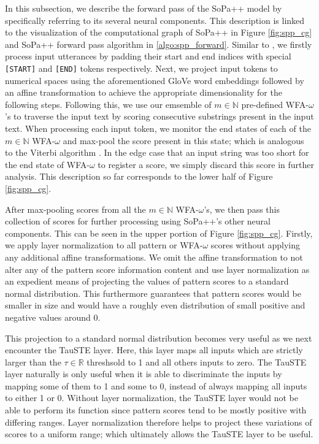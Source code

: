 In this subsection, we describe the forward pass of the SoPa++ model by
specifically referring to its several neural components. This description is
linked to the visualization of the computational graph of SoPa++ in Figure
\ref{fig:spp_cg} and SoPa++ forward pass algorithm in \ref{algo:spp_forward}.
Similar to \citet{schwartz2018sopa}, we firstly process input utterances by
padding their start and end indices with special \texttt{[START]} and
\texttt{[END]} tokens respectively. Next, we project input tokens to numerical
spaces using the aforementioned GloVe word embeddings followed by an affine
transformation to achieve the appropriate dimensionality for the following
steps. Following this, we use our emsemble of $m \in \mathbb{N}$ pre-defined
WFA-$\omega$'s to traverse the input text by scoring consecutive substrings
present in the input text. When processing each input token, we monitor the end
states of each of the $m \in \mathbb{N}$ WFA-$\omega$ and max-pool the score
present in this state; which is analogous to the Viterbi algorithm
\citep{viterbi1967error}. In the edge case that an input string was too short
for the end state of WFA-$\omega$ to register a score, we simply discard this
score in further analysis. This description so far corresponds to the lower half
of Figure \ref{fig:spp_cg}.

After max-pooling scores from all the $m \in \mathbb{N}$ WFA-$\omega$'s, we
then pass this collection of scores for further processing using SoPa++'s other
neural components. This can be seen in the upper portion of Figure
\ref{fig:spp_cg}. Firstly, we apply layer normalization \citep{ba2016layer} to
all pattern or WFA-$\omega$ scores without applying any additional affine
transformations. We omit the affine transformation to not alter any of the
pattern score information content and use layer normalization as an expedient
means of projecting the values of pattern scores to a standard normal
distribution. This furthermore guarantees that pattern scores would be
smaller in size and would have a roughly even distribution of small positive and
negative values around 0.

This projection to a standard normal distribution becomes very useful as we next
encounter the TauSTE layer. Here, this layer maps all inputs which are strictly
larger than the $\tau \in \mathbb{R}$ threshsold to 1 and all others inputs to
zero. The TauSTE layer naturally is only useful when it is able to discriminate
the inputs by mapping some of them to 1 and some to 0, instead of always mapping
all inputs to either 1 or 0. Without layer normalization, the TauSTE layer would
not be able to perform its function since pattern scores tend to be mostly
positive with differing ranges. Layer normalization therefore helps to project
these variations of scores to a uniform range; which ultimately allows the
TauSTE layer to be useful.

